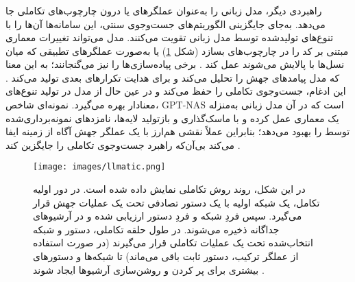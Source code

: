 \subsubsection{\protect{}}
راهبردی دیگر، مدل زبانی را به‌عنوان عملگرهای  یا  درون چارچوب‌های تکاملی جا می‌دهد. به‌جای جایگزینی الگوریتم‌های جست‌وجوی سنتی، این سامانه‌ها آن‌ها را با تنوع‌های تولیدشده توسط مدل زبانی تقویت می‌کنند. مدل می‌تواند تغییرات معماری مبتنی بر کد را در چارچوب‌های  بسازد (شکل \ref{fig:llmatic_flow}) \cite{LLMatic2024} یا به‌صورت عملگرهای تطبیقی که میان نسل‌ها با  پالایش می‌شوند عمل کند \cite{chen2023Evoprompting}. برخی پیاده‌سازی‌ها  را نیز می‌گنجانند؛ به این معنا که مدل پیامدهای جهش را تحلیل می‌کند و  برای هدایت تکرارهای بعدی تولید می‌کند \cite{ji2025RZNAS}. این ادغام،  جست‌وجوی تکاملی را حفظ می‌کند و در عین حال از  مدل در تولید تنوع‌های معنادار بهره می‌گیرد. نمونه‌ای شاخص، GPT-NAS است که در آن مدل زبانی به‌منزله یک  معماری عمل کرده و با ماسک‌گذاری و بازتولید لایه‌ها، نامزدهای نمونه‌برداری‌شده توسط  را بهبود می‌دهد؛ بنابراین عملاً نقشی هم‌ارز با یک عملگر جهش آگاه از زمینه ایفا می‌کند بی‌آن‌که راهبرد جست‌وجوی تکاملی را جایگزین کند \cite{Yu2025GPTNAS}.

\begin{figure}[h]
\centerline{\texttt{[image: images/llmatic.png]}}
\caption[روند روش تکاملی]
    {
        در این شکل، روند روش تکاملی نمایش داده شده است. در دور اولیه تکامل، یک شبکه اولیه با یک دستور تصادفی تحت یک عملیات جهش قرار می‌گیرد. سپس فردِ شبکه و فردِ دستور ارزیابی شده و در آرشیوهای جداگانه ذخیره می‌شوند. در طول حلقه تکاملی، دستور و شبکه انتخاب‌شده تحت یک عملیات تکاملی قرار می‌گیرند (در صورت استفاده از عملگر ترکیب، دستور ثابت باقی می‌ماند) تا شبکه‌ها و دستورهای بیشتری برای پر کردن و روشن‌سازی آرشیوها ایجاد شوند \cite{LLMatic2024}.
    }
    \label{fig:llmatic_flow}
\end{figure}
